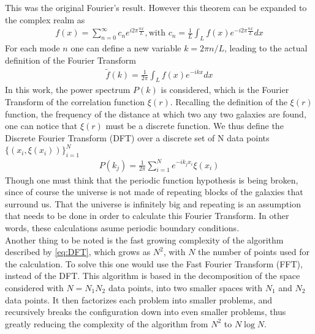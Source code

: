 This was the original Fourier's result. However this theorem can be expanded to the complex realm as 
\begin{align}
	f(x) = \sum_{n=0}^{\infty} c_n e^{i 2\pi \frac{nx}{L}}, \text{with } c_n = \frac{1}{L}\int_{L}^{} f(x) e^{-i 2\pi \frac{nx}{L}}dx 
\end{align}
For each mode $n$ one can define a new variable $k=2\pi n /L$, leading to the actual definition of the Fourier Transform 
\begin{align}
	\tilde{f}(k) = \frac{1}{2\pi}\int_{L}^{}  f(x) e^{-i k x} dx
\end{align}
In this work, the power spectrum $P(k)$ is considered, which is the Fourier Transform of the correlation function $\xi(r)$.  Recalling the definition of the $\xi(r)$ function, the frequency of the distance at which two any two galaxies are found, one can notice that  $\xi(r)$ must be a discrete function. We thus define the Discrete Fourier Transform (DFT) over a discrete set of N data points $\{\left( x_i, \xi(x_i) \right) \}_{i=1}^{N} $
\begin{align}
	P(k_j) = \frac{1}{2\pi}\sum_{i=1}^{N} e^{-i k_j x_{i}} \xi(x_i)
	\label{eq:DFT}
\end{align}
Though one must think that the periodic function hypothesis is being broken, since of course the universe is not made of repeating blocks of the galaxies that surround us. That the universe is infinitely big and repeating is an assumption that needs to be done in order to calculate this Fourier Transform. In other words, these calculations asume periodic boundary conditions.\\


Another thing to be noted is the fast growing complexity of the algorithm described by \eqref{eq:DFT}, which grows as $N^2$, with $N$ the number of points used for the calculation. 
To solve this one would use the Fast Fourier Transform (FFT), instead of the DFT. This algorithm is based in the decomposition of the space considered with $N=N_1N_2$ data points, into two smaller spaces with $N_1$ and $N_2$ data points. It then factorizes each problem into smaller problems, and recursively breaks the configuration down into even smaller problems, thus greatly reducing the complexity of the algorithm from $N^2$ to $N\log N$. \\

